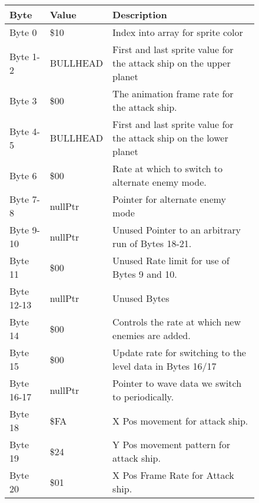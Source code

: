 \begin{figure}[H]
  {
  \setlength{\tabcolsep}{3.0pt}
  \setlength\cmidrulewidth{\heavyrulewidth} %
  \begin{adjustbox}{width=12cm}

\begin{tabular}{lll}
\toprule
 Byte       & Value              & Description                                                         \\
\midrule
 Byte 0     & \$10                & Index into array for sprite color                                   \\
 Byte 1-2   & BULLHEAD           & First and last sprite value for the attack ship on the upper planet \\
 Byte 3     & \$00                & The animation frame rate for the attack ship.                       \\
 Byte 4-5   & BULLHEAD           & First and last sprite value for the attack ship on the lower planet \\
 Byte 6     & \$00                & Rate at which to switch to alternate enemy mode.                    \\
 Byte 7-8   & nullPtr            & Pointer for alternate enemy mode                                    \\
 Byte 9-10  & nullPtr            & Unused Pointer to an arbitrary run of Bytes 18-21.                  \\
 Byte 11    & \$00                & Unused Rate limit for use of Bytes 9 and 10.                        \\
 Byte 12-13 & nullPtr            & Unused Bytes                                                        \\
 Byte 14    & \$00                & Controls the rate at which new enemies are added.                   \\
 Byte 15    & \$00                & Update rate for switching to the level data in Bytes 16/17          \\
 Byte 16-17 & nullPtr            & Pointer to wave data we switch to periodically.                     \\
 Byte 18    & \$FA                & X Pos movement for attack ship.                                     \\
 Byte 19    & \$24                & Y Pos movement pattern for attack ship.                             \\
 Byte 20    & \$01                & X Pos Frame Rate for Attack ship.                                   \\

\end{tabular}
\end{adjustbox}}
\end{figure}
